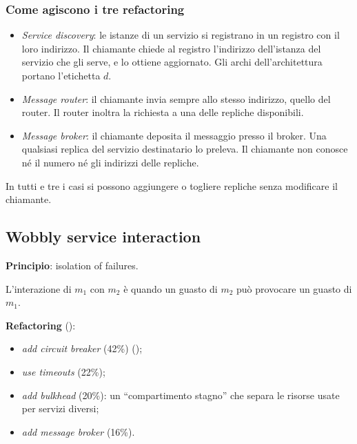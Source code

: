 \subsubsection{Come agiscono i tre refactoring\aggiunta}
\begin{itemize}
  \item \emph{Service discovery}: le istanze di un servizio si registrano in un registro con il loro indirizzo. Il
    chiamante chiede al registro l'indirizzo dell'istanza del servizio che gli serve, e lo ottiene aggiornato. Gli
    archi dell'architettura portano l'etichetta $d$.
  \item \emph{Message router}: il chiamante invia sempre allo stesso indirizzo, quello del router. Il router inoltra la
    richiesta a una delle repliche disponibili.
  \item \emph{Message broker}: il chiamante deposita il messaggio presso il broker. Una qualsiasi replica del servizio
    destinatario lo preleva. Il chiamante non conosce né il numero né gli indirizzi delle repliche.
\end{itemize}
In tutti e tre i casi si possono aggiungere o togliere repliche senza modificare il chiamante.

\subsection{Wobbly service interaction}

\textbf{Principio}: isolation of failures.

\begin{definizione}
L'interazione di $m_1$ con $m_2$ è  quando un guasto di $m_2$ può provocare un guasto di $m_1$.
\end{definizione}

\textbf{Refactoring} ():
\begin{itemize}
  \item \emph{add circuit breaker} (42\%) ();
  \item \emph{use timeouts} (22\%);
  \item \emph{add bulkhead} (20\%): un ``compartimento stagno'' che separa le risorse usate per servizi diversi;
  \item \emph{add message broker} (16\%).
\end{itemize}

